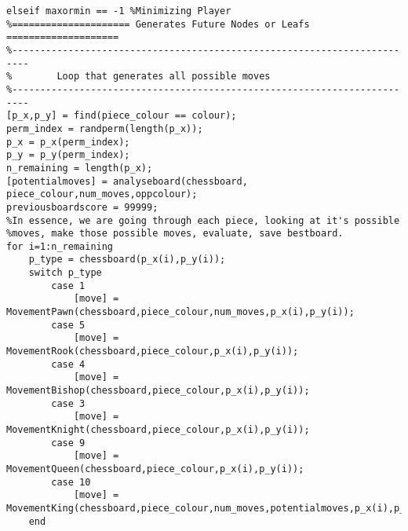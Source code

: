 \documentclass{article}
\begin{document}
\begin{lstlisting}
elseif maxormin == -1 %Minimizing Player
%===================== Generates Future Nodes or Leafs ====================
%-------------------------------------------------------------------------
%        Loop that generates all possible moves
%-------------------------------------------------------------------------
[p_x,p_y] = find(piece_colour == colour);
perm_index = randperm(length(p_x));
p_x = p_x(perm_index);
p_y = p_y(perm_index);
n_remaining = length(p_x);
[potentialmoves] = analyseboard(chessboard, piece_colour,num_moves,oppcolour);
previousboardscore = 99999;
%In essence, we are going through each piece, looking at it's possible
%moves, make those possible moves, evaluate, save bestboard.
for i=1:n_remaining
    p_type = chessboard(p_x(i),p_y(i));
    switch p_type
        case 1
            [move] = MovementPawn(chessboard,piece_colour,num_moves,p_x(i),p_y(i));
        case 5
            [move] = MovementRook(chessboard,piece_colour,p_x(i),p_y(i)); 
        case 4
            [move] = MovementBishop(chessboard,piece_colour,p_x(i),p_y(i));
        case 3
            [move] = MovementKnight(chessboard,piece_colour,p_x(i),p_y(i));
        case 9
            [move] = MovementQueen(chessboard,piece_colour,p_x(i),p_y(i));
        case 10
            [move] = MovementKing(chessboard,piece_colour,num_moves,potentialmoves,p_x(i),p_y(i));
    end


\end{lstlisting}
\end{document}

